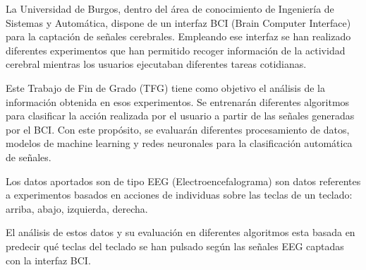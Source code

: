 
La Universidad de Burgos, dentro del área de conocimiento de Ingeniería de Sistemas y Automática, dispone de un interfaz BCI (Brain Computer Interface) para la captación de señales cerebrales. 
Empleando ese interfaz se han realizado diferentes experimentos que han permitido recoger información de la actividad cerebral mientras los usuarios ejecutaban diferentes tareas cotidianas. 

Este Trabajo de Fin de Grado (TFG) tiene como objetivo el análisis de la información obtenida en esos experimentos. Se entrenarán diferentes algoritmos para clasificar la acción realizada por el usuario a partir de las señales generadas por el BCI. Con este propósito, se evaluarán diferentes procesamiento de datos, modelos de machine learning y redes neuronales para la clasificación automática de señales.

Los datos aportados son de tipo EEG (Electroencefalograma) son datos referentes a experimentos basados en acciones de individuas sobre las teclas de un teclado: arriba, abajo, izquierda, derecha.

El análisis de estos datos y su evaluación en diferentes algoritmos esta basada en predecir qué teclas del teclado se han pulsado según las señales EEG captadas con la interfaz BCI.


